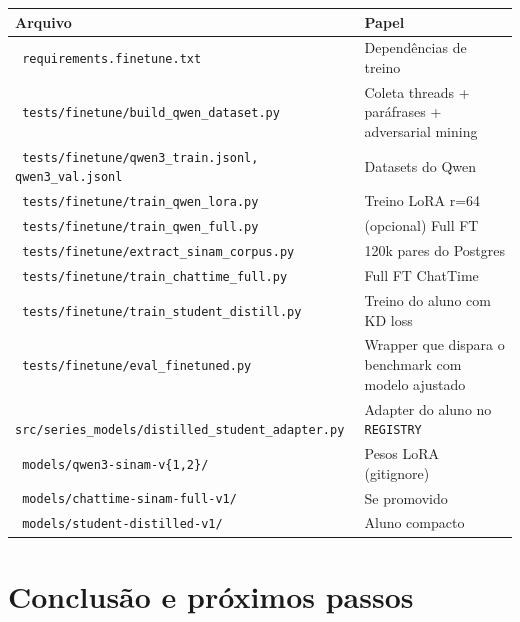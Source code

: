\documentclass[11pt,a4paper]{article}
\newcommand{\code}[1]{\texttt{\small #1}}
\newcommand{\file}[1]{\texttt{\small\color{black!75} #1}}
\begin{document}
\begin{table}[h!]
\centering
\small
\begin{tabularx}{\textwidth}{@{}l X@{}}
\toprule
\textbf{Arquivo} & \textbf{Papel} \\
\midrule
\file{requirements.finetune.txt}                                & Dependências de treino \\
\file{tests/finetune/build\_qwen\_dataset.py}                   & Coleta threads + paráfrases + adversarial mining \\
\file{tests/finetune/qwen3\_train.jsonl, qwen3\_val.jsonl}      & Datasets do Qwen \\
\file{tests/finetune/train\_qwen\_lora.py}                      & Treino LoRA r=64 \\
\file{tests/finetune/train\_qwen\_full.py}                      & (opcional) Full FT \\
\file{tests/finetune/extract\_sinam\_corpus.py}                 & 120k pares do Postgres \\
\file{tests/finetune/train\_chattime\_full.py}                  & Full FT ChatTime \\
\file{tests/finetune/train\_student\_distill.py}                & Treino do aluno com KD loss \\
\file{tests/finetune/eval\_finetuned.py}                        & Wrapper que dispara o benchmark com modelo ajustado \\
\file{src/series_models/distilled\_student\_adapter.py}           & Adapter do aluno no \code{REGISTRY} \\
\file{models/qwen3-sinam-v\{1,2\}/}                             & Pesos LoRA (gitignore) \\
\file{models/chattime-sinam-full-v1/}                           & Se promovido \\
\file{models/student-distilled-v1/}                             & Aluno compacto \\
\bottomrule
\end{tabularx}
\end{table}

\section{Conclusão e próximos passos}
\end{document}
